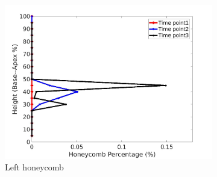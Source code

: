\begin{figure}[H]
\begin{subfigure}{.42\linewidth}
  \includegraphics[width=\linewidth,trim={{.0\wd0} {.0\wd0} {.0\wd0} {.0\wd0}},clip]{Appendix/Image_AppexA/BaseToApex/IPF5LeftLungHoneycombDiseaseAgainstHeight.jpg} %
  \caption{Left honeycomb}
  \label{fig:IPF5DiseaseAgainstHeight-e} 
\end{subfigure} 
\begin{subfigure}{.42\linewidth}%

\end{subfigure}
\end{figure}
